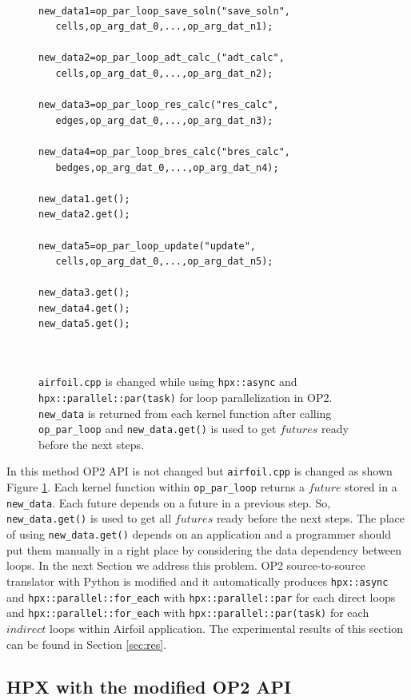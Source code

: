 \documentclass[conference]{IEEEtran}
\begin{document}
\begin{figure} [!h]
    \begin{lstlisting}   

new_data1=op_par_loop_save_soln("save_soln",
   cells,op_arg_dat_0,...,op_arg_dat_n1);
  
new_data2=op_par_loop_adt_calc_("adt_calc",
   cells,op_arg_dat_0,...,op_arg_dat_n2);
   
new_data3=op_par_loop_res_calc("res_calc",
   edges,op_arg_dat_0,...,op_arg_dat_n3);
 
new_data4=op_par_loop_bres_calc("bres_calc",
   bedges,op_arg_dat_0,...,op_arg_dat_n4);
   
new_data1.get();
new_data2.get();  
 
new_data5=op_par_loop_update("update",
   cells,op_arg_dat_0,...,op_arg_dat_n5);

new_data3.get();
new_data4.get();
new_data5.get();

    
    \end{lstlisting}
    \caption{\small{\texttt{airfoil.cpp} is changed while using \texttt{hpx::async} and \texttt{hpx::parallel::par(task)} for loop parallelization in OP2. \texttt{new\_data} is returned from each kernel function after calling \texttt{op\_par\_loop} and \texttt{new\_data.get()} is used to get $futures$ ready before the next steps.}}
    \label{l4}
\end{figure}


In this method OP2 API is not changed but \texttt{airfoil.cpp} is changed as shown Figure \ref{l4}. Each kernel function within \texttt{op\_par\_loop} returns a $future$ stored in a \texttt{new\_data}. Each future depends on a future in a previous step. So, \texttt{new\_data.get()} is used to get all $futures$ ready before the next steps. The place of using \texttt{new\_data.get()} depends on an application and a programmer should put them manually in a right place by considering the data dependency between loops. In the next Section we address this problem. OP2 source-to-source translator with Python is modified and it automatically produces \texttt{hpx::async} and \texttt{hpx::parallel::for\_each} with \texttt{hpx::parallel::par} for each direct loops and \texttt{hpx::parallel::for\_each} with \texttt{hpx::parallel::par(task)} for each $indirect$ loops within Airfoil application. The experimental results of this section can be found in Section \ref{sec:res}.



\subsection{\textbf{HPX with the modified OP2 API}}
\label{sec:with}
\end{document}
